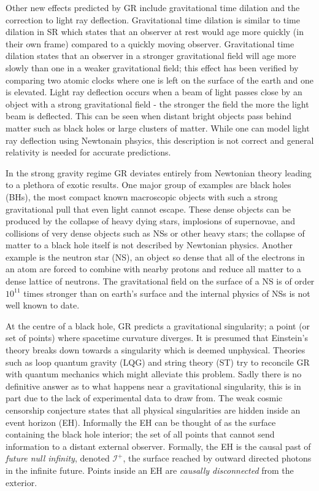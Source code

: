 Other new effects predicted by GR include gravitational time dilation and the correction to light ray deflection. Gravitational time dilation is similar to time dilation in SR which states that an observer at rest would age more quickly (in their own frame) compared to a quickly moving observer. Gravitational time dilation states that an observer in a stronger gravitational field will age more slowly than one in a weaker gravitational field; this effect has been verified by comparing two atomic clocks where one is left on the surface of the earth and one is elevated. Light ray deflection occurs when a beam of light passes close by an object with a strong gravitational field - the stronger the field the more the light beam is deflected. This can be seen when distant bright objects pass behind matter such as black holes or large clusters of matter. While one can model light ray deflection using Newtonain phsyics, this description is not correct and general relativity is needed for accurate predictions.

\color{orchid} In the strong gravity regime GR deviates entirely from Newtonian theory leading to a plethora of exotic results. One major group of examples are black holes (BHs), the most compact known macroscopic objects with such a strong gravitational pull that even light cannot escape. These dense objects can be produced by the collapse of heavy dying stars, implosions of supernovae, and collisions of very dense objects such as NSs or other heavy stars; the collapse of matter to a black hole itself is not described by Newtonian physics. Another example is the neutron star (NS), an object so dense that all of the electrons in an atom are forced to combine with nearby protons and reduce all matter to a dense lattice of neutrons. The gravitational field on the surface of a NS is of order $10^{11}$ times stronger than on earth's surface and the internal physics of NSs is not well known to date.

At the centre of a black hole, GR predicts a gravitational singularity; a point (or set of points) where spacetime curvature diverges. It is presumed that Einstein's theory breaks down towards a singularity which is deemed unphysical. Theories such as loop quantum gravity (LQG) and string theory (ST) try to reconcile GR with quantum mechanics which might alleviate this problem. Sadly there is no definitive answer as to what happens near a gravitational singularity, this is in part due to the lack of experimental data to draw from. The weak cosmic censorship conjecture states that all physical singularities are hidden inside an event horizon (EH). Informally the EH can be thought of as the surface containing the black hole interior; the set of all points that cannot send information to a distant external observer. Formally, the EH is the causal past of {\it future null infinity}, denoted $\mathcal{I}^+$, the surface reached by outward directed photons in the infinite future. Points inside an EH are {\it causally disconnected} from the exterior.

